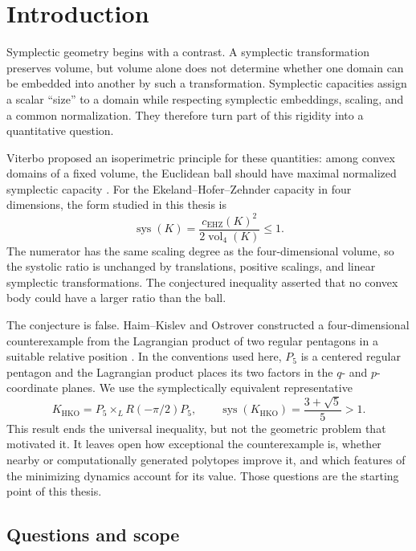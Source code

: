 \section{Introduction}\label{sec:introduction}

Symplectic geometry begins with a contrast.  A symplectic transformation
preserves volume, but volume alone does not determine whether one domain can be
embedded into another by such a transformation.  Symplectic capacities assign
a scalar ``size'' to a domain while respecting symplectic embeddings, scaling,
and a common normalization.  They therefore turn part of this rigidity into a
quantitative question.

Viterbo proposed an isoperimetric principle for these quantities: among convex
domains of a fixed volume, the Euclidean ball should have maximal normalized
symplectic capacity \cite{Viterbo2000}.  For the Ekeland--Hofer--Zehnder
capacity in four dimensions, the form studied in this thesis is
\[
  \operatorname{sys}(K)
  =\frac{c_{\mathrm{EHZ}}(K)^2}{2\operatorname{vol}_4(K)}
  \leq 1.
\]
The numerator has the same scaling degree as the four-dimensional volume, so
the systolic ratio is unchanged by translations, positive scalings, and
linear symplectic transformations.  The conjectured inequality asserted that
no convex body could have a larger ratio than the ball.

The conjecture is false.  Haim--Kislev and Ostrover constructed a
four-dimensional counterexample from the Lagrangian product of two regular
pentagons in a suitable relative position \cite{HaimKislevOstrover2024}.  In
the conventions used here, $P_5$ is a centered regular pentagon and the
Lagrangian product places its two factors in the $q$- and $p$-coordinate
planes.  We use the symplectically equivalent representative
\[
  K_{\mathrm{HKO}}=P_5\times_L R(-\pi/2)P_5,
  \qquad
  \operatorname{sys}(K_{\mathrm{HKO}})
  =\frac{3+\sqrt5}{5}>1.
\]
This result ends the universal inequality, but not the geometric problem that
motivated it.  It leaves open how exceptional the counterexample is, whether
nearby or computationally generated polytopes improve it, and which features
of the minimizing dynamics account for its value.  Those questions are the
starting point of this thesis.

\subsection{Questions and scope}

